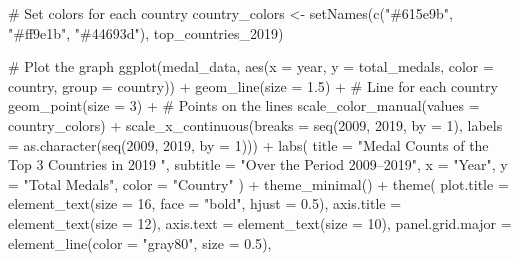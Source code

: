 \documentclass[
  letterpaper,
  DIV=11,
  numbers=noendperiod]{scrartcl}
\newenvironment{Shaded}{\begin{snugshade}}{\end{snugshade}}
\newcommand{\AttributeTok}[1]{\textcolor[rgb]{0.40,0.45,0.13}{#1}}
\newcommand{\CommentTok}[1]{\textcolor[rgb]{0.37,0.37,0.37}{#1}}
\newcommand{\DecValTok}[1]{\textcolor[rgb]{0.68,0.00,0.00}{#1}}
\newcommand{\FloatTok}[1]{\textcolor[rgb]{0.68,0.00,0.00}{#1}}
\newcommand{\FunctionTok}[1]{\textcolor[rgb]{0.28,0.35,0.67}{#1}}
\newcommand{\NormalTok}[1]{\textcolor[rgb]{0.00,0.23,0.31}{#1}}
\newcommand{\OtherTok}[1]{\textcolor[rgb]{0.00,0.23,0.31}{#1}}
\newcommand{\SpecialCharTok}[1]{\textcolor[rgb]{0.37,0.37,0.37}{#1}}
\newcommand{\StringTok}[1]{\textcolor[rgb]{0.13,0.47,0.30}{#1}}
\begin{document}
\begin{Shaded}
\begin{Highlighting}[]
\CommentTok{\# Set colors for each country}
\NormalTok{country\_colors }\OtherTok{\textless{}{-}} \FunctionTok{setNames}\NormalTok{(}\FunctionTok{c}\NormalTok{(}\StringTok{"\#615e9b"}\NormalTok{, }\StringTok{"\#ff9e1b"}\NormalTok{, }\StringTok{"\#44693d"}\NormalTok{), top\_countries\_2019)}

\CommentTok{\# Plot the graph}
\FunctionTok{ggplot}\NormalTok{(medal\_data, }\FunctionTok{aes}\NormalTok{(}\AttributeTok{x =}\NormalTok{ year, }\AttributeTok{y =}\NormalTok{ total\_medals, }\AttributeTok{color =}\NormalTok{ country, }\AttributeTok{group =}\NormalTok{ country)) }\SpecialCharTok{+}
  \FunctionTok{geom\_line}\NormalTok{(}\AttributeTok{size =} \FloatTok{1.5}\NormalTok{) }\SpecialCharTok{+} \CommentTok{\# Line for each country}
  \FunctionTok{geom\_point}\NormalTok{(}\AttributeTok{size =} \DecValTok{3}\NormalTok{) }\SpecialCharTok{+} \CommentTok{\# Points on the lines}
  \FunctionTok{scale\_color\_manual}\NormalTok{(}\AttributeTok{values =}\NormalTok{ country\_colors) }\SpecialCharTok{+}
  \FunctionTok{scale\_x\_continuous}\NormalTok{(}\AttributeTok{breaks =} \FunctionTok{seq}\NormalTok{(}\DecValTok{2009}\NormalTok{, }\DecValTok{2019}\NormalTok{, }\AttributeTok{by =} \DecValTok{1}\NormalTok{), }\AttributeTok{labels =} \FunctionTok{as.character}\NormalTok{(}\FunctionTok{seq}\NormalTok{(}\DecValTok{2009}\NormalTok{, }\DecValTok{2019}\NormalTok{, }\AttributeTok{by =} \DecValTok{1}\NormalTok{))) }\SpecialCharTok{+}
  \FunctionTok{labs}\NormalTok{(}
    \AttributeTok{title =} \StringTok{"Medal Counts of the Top 3 Countries in 2019 "}\NormalTok{,}
    \AttributeTok{subtitle =} \StringTok{"Over the Period 2009–2019"}\NormalTok{,}
    \AttributeTok{x =} \StringTok{"Year"}\NormalTok{,}
    \AttributeTok{y =} \StringTok{"Total Medals"}\NormalTok{,}
    \AttributeTok{color =} \StringTok{"Country"}
\NormalTok{  ) }\SpecialCharTok{+}
  \FunctionTok{theme\_minimal}\NormalTok{() }\SpecialCharTok{+}
  \FunctionTok{theme}\NormalTok{(}
    \AttributeTok{plot.title =} \FunctionTok{element\_text}\NormalTok{(}\AttributeTok{size =} \DecValTok{16}\NormalTok{, }\AttributeTok{face =} \StringTok{"bold"}\NormalTok{, }\AttributeTok{hjust =} \FloatTok{0.5}\NormalTok{),}
    \AttributeTok{axis.title =} \FunctionTok{element\_text}\NormalTok{(}\AttributeTok{size =} \DecValTok{12}\NormalTok{),}
    \AttributeTok{axis.text =} \FunctionTok{element\_text}\NormalTok{(}\AttributeTok{size =} \DecValTok{10}\NormalTok{),}
    \AttributeTok{panel.grid.major =} \FunctionTok{element\_line}\NormalTok{(}\AttributeTok{color =} \StringTok{"gray80"}\NormalTok{, }\AttributeTok{size =} \FloatTok{0.5}\NormalTok{),}

\end{Highlighting}
\end{Shaded}
\end{document}
